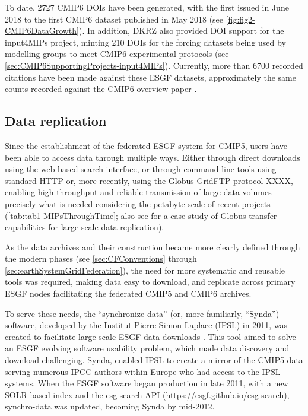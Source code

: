 \documentclass[manuscript]{copernicus}
\newcommand{\mycomment}[1]{}
\def\cred#1{{\color{red}#1}}
\begin{document}
To date, 2727 CMIP6 DOIs have been generated, with the first issued in June 2018 to the first CMIP6 dataset published in May 2018 (see \autoref{fig:fig2-CMIP6DataGrowth}). In addition, DKRZ also provided DOI support for the input4MIPs project, minting 210 DOIs for the forcing datasets being used by modelling groups to meet CMIP6 experimental protocols (see \autoref{sec:CMIP6SupportingProjects-input4MIPs}). Currently, more than 6700 recorded citations have been made against these ESGF datasets, approximately the same counts recorded against the CMIP6 overview paper \citep[see \autoref{sec:CMIP6Impact};][]{eyring_overview_2016}.

\mycomment{
https://www.ipcc-data.org/sim/gcm_monthly/AR5/WG1-Archive.html
https://www.wdc-climate.de/ui/statistics?type=cmip6_doi_registration
https://commons.datacite.org/repositories/8orcv25 - Master overview 6720 citations
https://www.wdc-climate.de/ords/f?p=127:2 - CMIP6 data references
https://www.wdc-climate.de/ui/cmip6?input=CMIP6.ScenarioMIP.NOAA-GFDL.GFDL-CM4.ssp585
https://www.wdc-climate.de/ui/cmip6?input=input4MIPs.CMIP6.CMIP.PCMDI
}


\subsection{Data replication}
\label{sec:CMIPDataReplication}

Since the establishment of the federated ESGF system for CMIP5, users have been able to access data through multiple ways. Either through direct downloads using the web-based search interface, or through command-line tools using standard HTTP or, more recently, using the Globus GridFTP protocol XXXX, enabling high-throughput and reliable transmission of large data volumes---precisely what is needed considering the petabyte scale of recent projects (\autoref{tab:tab1-MIPsThroughTime}; also see \cite{lacinski_automated_2024} for a case study of Globus transfer capabilities for large-scale data replication).

As the data archives and their construction became more clearly defined through the modern phases (see \autoref{sec:CFConventions} through \autoref{sec:earthSystemGridFederation}), the need for more systematic and reusable tools was required, making data easy to download, and replicate across primary ESGF nodes facilitating the federated CMIP5 and CMIP6 archives.

To serve these needs, the ``synchronize data'' (or, more familiarly, ``Synda'') software, developed by the Institut Pierre-Simon Laplace (IPSL) in 2011, was created to facilitate large-scale ESGF data downloads \citep{denvil_synchronize_2020}. This tool aimed to solve an ESGF evolving software usability problem, which made data discovery and download challenging. Synda, enabled IPSL to create a mirror of the CMIP5 data serving numerous IPCC authors within Europe who had access to the IPSL systems. When the ESGF software began production in late 2011, with a new SOLR-based index and the esg-search API (\url{https://esgf.github.io/esg-search}), synchro-data was updated, becoming Synda by mid-2012.
\end{document}
